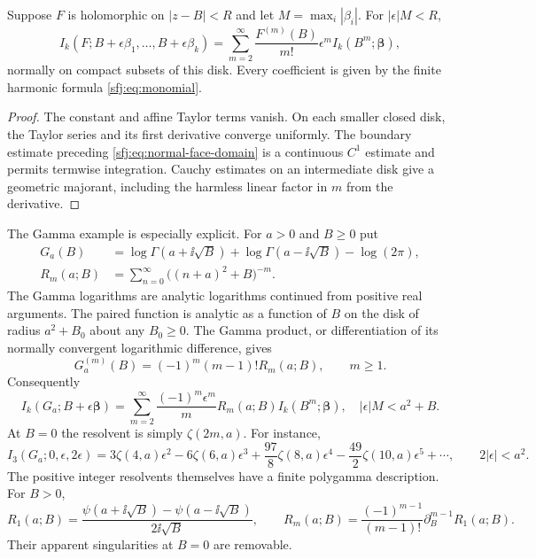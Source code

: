 \begin{corollary}
\label{sfj:cor:collision}
Suppose $F$ is holomorphic on $|z-B|<R$ and let
$M=\max_i|\beta_i|$.  For $|\epsilon|M<R$,
\begin{equation}\label{sfj:eq:collision}
 I_k(F;B+\epsilon\beta_1,\ldots,B+\epsilon\beta_k)
  =\sum_{m=2}^\infty
       \frac{F^{(m)}(B)}{m!}\epsilon^m
                     I_k(B^m;\boldsymbol\beta),
\end{equation}
normally on compact subsets of this disk.  Every coefficient is given
by the finite harmonic formula \eqref{sfj:eq:monomial}.
\end{corollary}
\begin{proof}
The constant and affine Taylor terms vanish.  On each smaller closed
disk, the Taylor series and its first derivative converge uniformly.
The boundary estimate preceding \eqref{sfj:eq:normal-face-domain}
is a continuous $C^1$ estimate and permits termwise integration.
Cauchy estimates on an intermediate disk give a geometric majorant,
including the harmless linear factor in $m$ from the derivative.
\end{proof}

The Gamma example is especially explicit.  For $a>0$ and $B\ge0$ put
\begin{align}
 G_a(B)&=\log\Gamma(a+\ii\sqrt B)
          +\log\Gamma(a-\ii\sqrt B)-\log(2\pi),
                    \label{sfj:eq:gammaG}\\
 R_m(a;B)&=\sum_{n=0}^\infty\bigl((n+a)^2+B\bigr)^{-m}.
                    \label{sfj:eq:resolvent}
\end{align}
The Gamma logarithms are analytic logarithms continued from positive
real arguments.  The paired function is analytic as a function of
$B$ on the disk of radius $a^2+B_0$ about any $B_0\ge0$.  The
Gamma product, or differentiation of its normally convergent logarithmic
difference, gives
\begin{equation}\label{sfj:eq:gamma-derivatives}
 G_a^{(m)}(B)=(-1)^m(m-1)!R_m(a;B),\qquad m\ge1.
\end{equation}
Consequently
\begin{equation}\label{sfj:eq:gamma-collision}
 \boxed{\displaystyle
 I_k(G_a;B+\epsilon\boldsymbol\beta)
   =\sum_{m=2}^\infty\frac{(-1)^m\epsilon^m}{m}
                  R_m(a;B)I_k(B^m;\boldsymbol\beta),
 \quad |\epsilon|M<a^2+B.}
\end{equation}
At $B=0$ the resolvent is simply $\zeta(2m,a)$.  For instance,
\begin{equation}\label{sfj:eq:gamma-three-example}
 I_3(G_a;0,\epsilon,2\epsilon)
   =3\zeta(4,a)\epsilon^2-6\zeta(6,a)\epsilon^3
       +\frac{97}{8}\zeta(8,a)\epsilon^4
       -\frac{49}{2}\zeta(10,a)\epsilon^5+\cdots,
 \qquad 2|\epsilon|<a^2.
\end{equation}
The positive integer resolvents themselves have a finite polygamma
description.  For $B>0$,
\begin{equation}\label{sfj:eq:resolvent-digamma}
 R_1(a;B)=
 \frac{\psi(a+\ii\sqrt B)-\psi(a-\ii\sqrt B)}{2\ii\sqrt B},
 \qquad
 R_m(a;B)=\frac{(-1)^{m-1}}{(m-1)!}
                 \partial_B^{m-1}R_1(a;B).
\end{equation}
Their apparent singularities at $B=0$ are removable.

